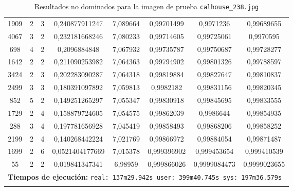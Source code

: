 \begin{longtable}{|c|c|c|c|c|c|c|c|}
1909 & 2 & 3 & 0,240877911247 & 7,089664 & 0,99701499 & 0,9971236 & 0,99689655 \\
4067 & 3 & 2 & 0,232181668246 & 7,080233 & 0,99714605 & 0,99725061 & 0,9970595 \\
698 & 4 & 2 & 0,2096884848 & 7,067932 & 0,99735787 & 0,99750687 & 0,99728277 \\
1642 & 2 & 2 & 0,211090253982 & 7,064363 & 0,99794902 & 0,99801326 & 0,99788597 \\
3424 & 2 & 3 & 0,202283090287 & 7,064318 & 0,99819884 & 0,99827647 & 0,99810837 \\
2499 & 3 & 3 & 0,180391097892 & 7,059813 & 0,9982182 & 0,99831156 & 0,99820345 \\
852 & 5 & 2 & 0,149251265297 & 7,055347 & 0,99830918 & 0,99845695 & 0,99833555 \\
1729 & 2 & 4 & 0,158879724605 & 7,054575 & 0,99862039 & 0,9986644 & 0,99854935 \\
288 & 3 & 4 & 0,197781656928 & 7,045419 & 0,99858493 & 0,99868206 & 0,99858252 \\
2199 & 2 & 4 & 0,140268442224 & 7,021769 & 0,99866972 & 0,99884054 & 0,99871487 \\
1699 & 2 & 6 & 0,0521404177669 & 7,015378 & 0,999396902 & 0,999453654 & 0,999410539 \\
55 & 2 & 2 & 0,019841347341 & 6,98959 & 0,999866026 & 0,9999084473 & 0,9999023655 \\
\multicolumn{8}{|c|}{\textbf{Tiempos de ejecución:} \texttt{real: 137m29.942s user: 399m40.745s sys: 197m36.579s
}}\\ \hline
\caption{Resultados no dominados para la imagen de prueba \texttt{calhouse\_238.jpg}}
\label{tab:calhouse_238}
\end{longtable}
\normalsize

